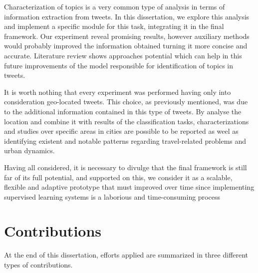Characterization of topics is a very common type of analysis in terms of information extraction from tweets. In this dissertation, we explore this analysis and implement a specific module for this task, integrating it in the final framework. Our experiment reveal promising results, however auxiliary methods would probably improved the information obtained turning it more concise and accurate. Literature review shows approaches potential which can help in this future improvements of the model responsible for identification of topics in tweets.

It is worth nothing that every experiment was performed having only into consideration geo-located tweets. This choice, as previously mentioned, was due to the additional information contained in this type of tweets. By analyse the location and combine it with results of the classification tasks, characterizations and studies over specific areas in cities are possible to be reported as weel as identifying existent and notable patterns regarding travel-related problems and urban dynamics.

Having all considered, it is necessary to divulge that the final framework is still far of its full potential, and supported on this, we consider it as a scalable, flexible and adaptive prototype that must improved over time since implementing supervised learning systems is a laborious and time-consuming process

\section{Contributions}

At the end of this dissertation, efforts applied are summarized in three different types of contributions.

